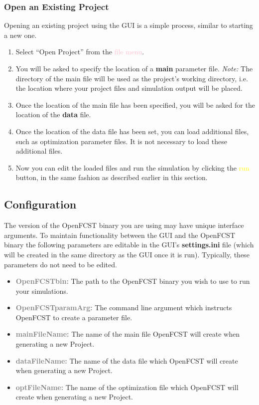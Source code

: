 \subsubsection{Open an Existing Project}\label{sec:open_existing_project_gui}
Opening an existing project using the GUI is a simple process, similar to starting a new one.

\begin{enumerate}
 \item Select ``Open Project'' from  the \textcolor{pink}{file menu}.
 \item You will be asked to specify the location of a \textbf{main} parameter file. \emph{Note:} The directory of the main file will be used as the project\textquoteright s working directory, i.e. the location where your project files and simulation output will be placed. 
 \item Once the location of the main file has been specified, you will be asked for the location of the \textbf{data} file.
 \item Once the location of the data file has been set, you can load additional files, such as optimization parameter files. It is not necessary to load these additional files. 
 \item Now you can edit the loaded files and run the simulation by clicking the \textcolor{yellow}{run} button, in the same fashion as described earlier in this section.
\end{enumerate}

\subsection{Configuration}
The version of the OpenFCST binary you are using may have unique interface arguments. To maintain functionality between the GUI and the OpenFCST binary the following parameters are editable in the GUI's \textbf{settings.ini} file (which will be created in the same directory as the GUI once it is run). Typically,  these parameters do not need to be edited.

\begin{itemize}
 \item \textcolor{grey}{\textbf{OpenFCSTbin:}} The path to the OpenFCST binary you wish to use to run your simulations.
 \item \textcolor{grey}{\textbf{OpenFCSTparamArg:}} The command line argument which instructs OpenFCST to create a parameter file.
 \item \textcolor{grey}{\textbf{mainFileName:}} The name of the main file OpenFCST will create when generating a new Project.
 \item \textcolor{grey}{\textbf{dataFileName:}} The name of the data file which OpenFCST will create when generating a new Project.
 \item \textcolor{grey}{\textbf{optFileName:}} The name of the optimization file which OpenFCST will create when generating a new Project.
\end{itemize}

